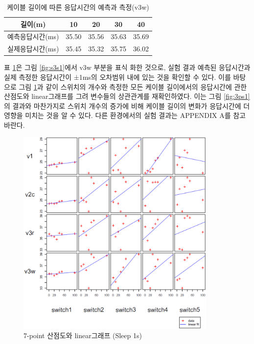 \documentclass[11pt
  , a4paper
  , article
  , oneside
]{memoir}
\begin{document}
\begin{table}[!b]
\begin{center}
\begin{tabular}{c|c|c|c|c}\hline
길이(m) & 10 & 20 & 30 & 40 \\ \hline
예측응답시간(ms)& 35.50 & 35.56 & 35.63 & 35.69 \\ \hline
실제응답시간(ms)& 35.45 & 35.32 & 35.75 & 36.02 \\ \hline
\end{tabular}
\caption{케이블 길이에 따른 응답시간의 예측과 측정(v3w)}
  \label{table:predict_time}  
\end{center}
\end{table} 

표 \ref{table:predict_time}은 그림 \ref{fig:s3s1}에서  v3w 부분을 표식 화한 것으로, 실험 결과 예측된 응답시간과 실제 측정한 응답시간이 ±1ms의 오차범위 내에 있는 것을 확인할 수 있다. 이를 바탕으로 그림 \ref{fig:7ps1}과 같이  스위치의 개수와 측정한 모든 케이블 길이에서의 응답시간에 관한 산점도와 linear그래프를 그려 변수들의 상관관계를 재확인하였다. 이는 그림 \ref{fig:3ps1}의 결과와 마찬가지로 스위치 개수의 증가에 비해 케이블 길이의 변화가 응답시간에 더 영향을 미치는 것을 알 수 있다. 다른 환경에서의 실험 결과는 APPENDIX A를 참고 바란다.

\begin{figure}[!h]
  \centering
  \includegraphics[width=0.88\textwidth]{./images/7point_sleep1s.eps}
  \caption{7-point 산점도와 linear그래프 (Sleep 1s)}
  \label{fig:7ps1}   
\end{figure}
\end{document}
